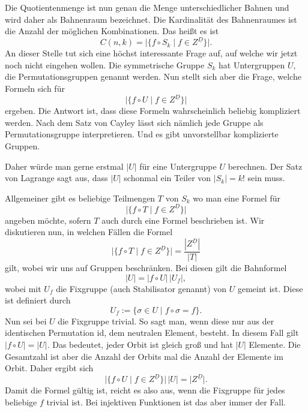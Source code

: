 \documentclass[a4paper,12pt,fleqn]{article}
\begin{document}
Die Quotientenmenge ist nun genau die Menge unterschiedlicher
Bahnen und wird daher als Bahnenraum bezeichnet. Die Kardinalität
des Bahnenraumes ist die Anzahl der möglichen Kombinationen.
Das heißt es ist
\begin{equation}
C(n,k) = |\{f\circ S_k\;|\;f\in Z^{\underline D}\}|.
\end{equation}
An dieser Stelle tut sich eine höchst interessante Frage auf,
auf welche wir jetzt noch nicht eingehen wollen. Die symmetrische
Gruppe $S_k$ hat Untergruppen $U$, die Permutationsgruppen
genannt werden. Nun stellt sich aber die Frage, welche Formeln
sich für
\begin{equation}
|\{f\circ U\;|\;f\in Z^{\underline D}\}|
\end{equation}
ergeben. Die Antwort ist, dass diese Formeln wahrscheinlich
beliebig kompliziert werden. Nach dem Satz von Cayley lässt sich
nämlich jede Gruppe als Permutationsgruppe interpretieren. Und
es gibt unvorstellbar komplizierte Gruppen.

Daher würde man gerne erstmal $|U|$ für eine Untergruppe
$U$ berechnen. Der Satz von Lagrange sagt aus, dass $|U|$ schonmal
ein Teiler von $|S_k|=k!$ sein muss.

Allgemeiner gibt es beliebige Teilmengen $T$ von $S_k$ wo man
eine Formel für
\[|\{f\circ T\;|\;f\in Z^{\underline D}\}|\]
angeben möchte, sofern $T$ auch durch eine Formel
beschrieben ist. Wir diskutieren nun, in welchen Fällen die
Formel
\begin{equation}
|\{f\circ T\;|\;f\in Z^{\underline D}\}|
= \frac{|Z^{\underline D}|}{|T|}
\end{equation}
gilt, wobei wir uns auf Gruppen beschränken.
Bei diesen gilt die Bahnformel
\begin{equation}
|U| = |f\circ U|\,|U_f|,
\end{equation}
wobei mit $U_f$ die Fixgruppe (auch Stabilisator genannt) von $U$
gemeint ist. Diese ist definiert durch
\begin{equation}
U_f := \{\sigma\in U\;|\; f\circ\sigma = f\}.
\end{equation}
Nun sei bei $U$ die Fixgruppe trivial. So sagt man,
wenn diese nur aus der identischen Permutation $\mathrm{id}$,
dem neutralen Element, besteht. In diesem Fall gilt $|f\circ U|=|U|$.
Das bedeutet, jeder Orbit ist gleich groß und hat $|U|$ Elemente.
Die Gesamtzahl ist aber die Anzahl der Orbits mal die Anzahl der
Elemente im Orbit. Daher ergibt sich
\begin{equation}
|\{f\circ U\;|\;f\in Z^{\underline D}\}|\,|U|
= |Z^{\underline D}|.
\end{equation}
Damit die Formel gültig ist, reicht es also aus, wenn die
Fixgruppe für jedes beliebige $f$ trivial ist. Bei injektiven
Funktionen ist das aber immer der Fall.
\end{document}
